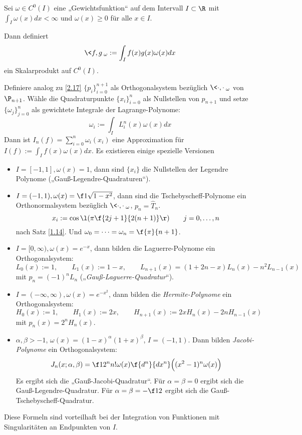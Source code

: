 \documentclass[11pt]{scrartcl}
\begin{document}
\begin{nt*}
	Sei $\omega \in C^0(I)$ eine „Gewichtsfunktion“ auf dem Intervall $I\subset \R$ mit $\int_I \omega(x) dx < \infty$ und $\omega(x) \ge 0$ für alle $x\in I$.

	Dann definiert 
	\[
		\<f,g\>_\omega := \int_I f(x) g(x) \omega(x) dx
	\]
	ein Skalarprodukt auf $C^0(I)$.

	Definiere analog zu \ref{2.17} $\{p_i\}_{i=0}^{n+1}$ als Orthogonalsystem bezüglich $\<\cdot,\cdot\>_\omega$ von $\P_{n+1}$.
	Wähle die Quadraturpunkte $\{x_i\}_{i=0}^n$ als Nullstellen von $p_{n+1}$ und setze $\{\omega_j\}_{j=0}^n$ als gewichtete Integrale der Lagrange-Polynome:
	\[
		\omega_i := \int_I L_i^n(x) \omega(x) dx
	\]
	Dann ist $I_n(f) = \sum_{i=0}^n\omega_i (x_i)$ eine Approximation für $I(f) := \int_I f(x) \omega(x) dx$.
	Es existieren einige spezielle Versionen
	\begin{itemize}
		\item
			$I=[-1,1], \omega(x) =1$, dann sind $\{x_i\}$ die Nullstellen der Legendre Polynome („Gauß-Legendre-Quadraturen“).
		\item
			$I=(-1,1), \omega(x) = \f 1{\sqrt{1-x^2}}$, dann sind die Tschebyscheff-Polynome ein Orthonormalsystem bezüglich $\<\cdot,\cdot\>_\omega$, $p_n= \hat T_n$.
			\[
				x_i := \cos \l(\pi \f {2j+1}{2(n+1)}\r) \qquad j= 0,\dotsc, n
			\]
			nach Satz \ref{1.14}. Und $\omega_0 = \dotsb = \omega_n = \f {\pi}{n+1}$.
		\item
			$I=[0,\infty), \omega(x) = e^{-x}$, dann bilden die Laguerre-Polynome ein Orthogonalsystem:
			\[
				L_0(x) := 1, \qquad L_1(x) := 1-x, \qquad L_{n+1}(x) = (1+2n-x)L_n(x) - n^2 L_{n-1}(x)
			\]
			mit $p_n = (-1)^n L_n$ („\emph{Gauß-Laguerre-Quadratur}“).
		\item
			$I=(-\infty,\infty), \omega(x) = e^{-x^2}$, dann bilden die \emph{Hermite-Polynome} ein Orthogonalsystem:
			\[
				H_0(x) := 1, \qquad H_1(x) := 2x, \qquad H_{n+1}(x) := 2xH_n(x) - 2nH_{n-1}(x)
			\]
			mit $p_n(x)=2^n H_n(x)$.
		\item
			$\alpha, \beta > -1$, $\omega(x) = (1-x)^\alpha (1+x)^\beta$, $I=(-1,1)$.
			Dann bilden \emph{Jacobi-Polynome} ein Orthogonalsystem:
			\[
				J_n(x;\alpha,\beta) = \f 1{2^n n! \omega(x)}\f {d^n}{dx^n}\Big( (x^2-1)^n \omega(x)\Big)
			\]
			Es ergibt sich die „Gauß-Jacobi-Quadratur“.
			Für $\alpha=\beta=0$ ergibt sich die Gauß-Legendre-Quadratur.
			Für $\alpha=\beta= -\f 12$ ergibt sich die Gauß-Tschebyscheff-Quadratur.
	\end{itemize}
	Diese Formeln sind vorteilhaft bei der Integration von Funktionen mit Singularitäten an Endpunkten von $I$.
\end{nt*}
\end{document}
